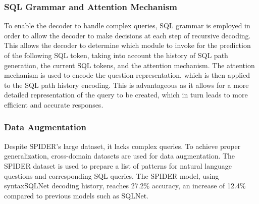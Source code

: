 \subsubsection*{SQL Grammar and Attention Mechanism}

To enable the decoder to handle complex queries, SQL grammar is employed in order to allow the decoder to make decisions at each step of recursive decoding. This allows the decoder to determine which module to invoke for the prediction of the following SQL token, taking into account the history of SQL path generation, the current SQL tokens, and the attention mechanism. The attention mechanism is used to encode the question representation, which is then applied to the SQL path history encoding. This is advantageous as it allows for a more detailed representation of the query to be created, which in turn leads to more efficient and accurate responses.

\subsubsection*{Data Augmentation}

Despite SPIDER's large dataset, it lacks complex queries. To achieve proper generalization, cross-domain datasets are used for data augmentation. The SPIDER dataset is used to prepare a list of patterns for natural language questions and corresponding SQL queries. The SPIDER model, using syntaxSQLNet decoding history, reaches 27.2\% accuracy, an increase of 12.4\% compared to previous models such as SQLNet.